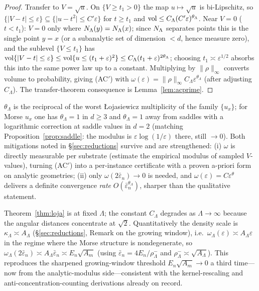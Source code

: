 \begin{proof}
Transfer to $V=\sqrt{u}$. On $\{V\ge t_1>0\}$ the map $u\mapsto\sqrt u$ is bi-Lipschitz,
so $\{\lvert V-t\rvert\le\varepsilon\}\subseteq\{\lvert u-t^2\rvert\le C'\varepsilon\}$ for
$t\ge t_1$ and $\operatorname{vol}\le C_\Lambda(C'\varepsilon)^{\theta_\Lambda}$. Near $V=0$
($t<t_1$): $V=0$ only where $N_\Lambda(y)=N_\Lambda(x)$; since $N_\Lambda$ separates points this is the
single point $y=x$ (or a subanalytic set of dimension $<d$, hence measure zero), and the
sublevel $\{V\le t_1\}$ has $\operatorname{vol}\{\lvert V-t\rvert\le\varepsilon\}\le\operatorname{vol}\{u\le(t_1+\varepsilon)^2\}
\le C_\Lambda(t_1+\varepsilon)^{2\theta_\Lambda}$; choosing $t_1\asymp\varepsilon^{1/2}$
absorbs this into the same power law up to a constant. Multiplying by
$\lVert\rho\rVert_\infty$ converts volume to probability, giving (AC$'$) with
$\omega(\varepsilon)=\lVert\rho\rVert_\infty C_\Lambda\varepsilon^{\theta_\Lambda}$
(after adjusting $C_\Lambda$). The transfer-theorem consequence is Lemma~\ref{lem:acprime}.
\end{proof}

\begin{remark}
$\theta_\Lambda$ is the reciprocal of the worst \L ojasiewicz multiplicity of the family
$\{u_x\}$; for Morse $u_x$ one has $\theta_\Lambda=1$ in $d\ge3$ and $\theta_\Lambda=1$
away from saddles with a logarithmic correction at saddle values in $d=2$ (matching
Proposition~\ref{prop:saddle}: the modulus is $\varepsilon\log(1/\varepsilon)$ there, still
$\to0$). Both mitigations noted in \S\ref{sec:reductions} survive and are strengthened: (i)
$\omega$ is directly measurable per substrate (estimate the empirical modulus of sampled
$V$-values), turning (AC$'$) into a per-instance certificate with a proven a-priori form on
analytic geometries; (ii) only $\omega(2\bar\varepsilon_n)\to0$ is needed, and
$\omega(\varepsilon)=C\varepsilon^{\theta}$ delivers a definite convergence \emph{rate}
$O(\bar\varepsilon_n^{\theta_\Lambda})$, sharper than the qualitative statement.
\end{remark}

\begin{remark}
Theorem~\ref{thm:loja} is at fixed $\Lambda$; the constant $C_\Lambda$ degrades as
$\Lambda\to\infty$ because the angular distances concentrate at $\sqrt2$. Quantitatively
the density scale is $\kappa_\Lambda\asymp A_\Lambda$ (\S\ref{sec:reductions}, Remark on the
growing window), i.e.\ $\omega_\Lambda(\varepsilon)\asymp A_\Lambda\varepsilon$ in the
regime where the Morse structure is nondegenerate, so
$\omega_\Lambda(2\bar\varepsilon_n)\asymp A_\Lambda\bar\varepsilon_n\asymp E_n\sqrt{A_m}$
(using $\bar\varepsilon_n=4E_n/\rho^-_\Lambda$ and $\rho^-_\Lambda\asymp\sqrt{A_\Lambda}$).
This reproduces the sharpened growing-window threshold $E_n\sqrt{A_m}\to0$ a third time---%
now from the analytic-modulus side---consistent with the kernel-rescaling and
anti-concentration-counting derivations already on record.
\end{remark}

